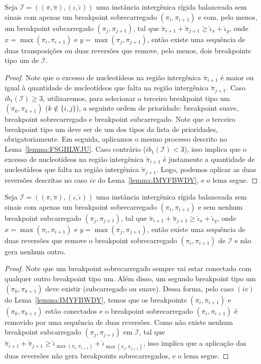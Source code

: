 \begin{lemma}\label{lemma:RHTVEKOL}
Seja $\mathcal{I} = ((\pi,\breve\pi),(\iota,\breve\iota))$ uma instância intergênica rígida balanceada sem sinais com apenas um breakpoint sobrecarregado $(\pi_i,\pi_{i+1})$ e com, pelo menos, um breakpoint subcarregado $(\pi_j,\pi_{j+1})$, tal que $\breve\pi_{i+1} + \breve\pi_{j+1} \ge \breve\iota_{x} + \breve\iota_{y}$, onde $x = \max(\pi_i,\pi_{i+1})$ e $y=\max(\pi_j,\pi_{j+1})$, então existe uma sequência de duas transposições ou duas reversões que remove, pelo menos, dois breakpoints tipo um de $\mathcal{I}$.
\end{lemma}
\begin{proof}
Note que o excesso de nucleotídeos na região intergênica $\breve\pi_{i+1}$ é maior ou igual à quantidade de nucleotídeos que falta na região intergênica $\breve\pi_{j+1}$. Caso $ib_1(\mathcal{I})\ge 3$, utilizaremos, para selecionar o terceiro breakpoint tipo um $(\pi_k,\pi_{k+1})$ ($k \notin \{i,j\}$), a seguinte ordem de prioridade: breakpoint suave, breakpoint sobrecarregado e breakpoint subcarregado. Note que o terceiro breakpoint tipo um deve ser de um dos tipos da lista de prioridades, obrigatoriamente. Em seguida, aplicamos o mesmo processo descrito no Lema~\ref{lemma:FSGHLWJU}. Caso contrário ($ib_1(\mathcal{I}) < 3$), isso implica que o excesso de nucleotídeos na região intergênica $\breve\pi_{i+1}$ é justamente a quantidade de nucleotídeos que falta na região intergênica $\breve\pi_{j+1}$. Logo, podemos aplicar as duas reversões descritas no caso $iv$ do Lema~\ref{lemma:IMYFBWDY}, e o lema segue.
\end{proof}

\begin{lemma}\label{lemma:ICDGSTEE}
Seja $\mathcal{I} = ((\pi,\breve\pi),(\iota,\breve\iota))$ uma instância intergênica rígida balanceada sem sinais com apenas um breakpoint sobrecarregado $(\pi_i,\pi_{i+1})$ e sem nenhum breakpoint subcarregado $(\pi_j,\pi_{j+1})$, tal que $\breve\pi_{i+1} + \breve\pi_{j+1} \ge \breve\iota_{x} + \breve\iota_{y}$, onde $x = \max(\pi_i,\pi_{i+1})$ e $y=\max(\pi_j,\pi_{j+1})$, então existe uma sequência de duas reversões que remove o breakpoint sobrecarregado $(\pi_i,\pi_{i+1})$ de $\mathcal{I}$ e não gera nenhum outro.
\end{lemma}
\begin{proof}
Note que um breakpoint sobrecarregado sempre vai estar conectado com qualquer outro breakpoint tipo um. Além disso, um segundo breakpoint tipo um $(\pi_k,\pi_{k+1})$ deve existir (subcarregado ou suave). Dessa forma, pelo caso $(iv)$ do Lema~\ref{lemma:IMYFBWDY}, temos que os breakpoints $(\pi_i,\pi_{i+1})$ e $(\pi_k,\pi_{k+1})$ estão conectados e o breakpoint sobrecarregado $(\pi_i,\pi_{i+1})$ é removido por uma sequência de duas reversões. Como não existe nenhum breakpoint subcarregado $(\pi_j,\pi_{j+1})$ em $\mathcal{I}$, tal que $\breve\pi_{i+1} + \breve\pi_{j+1} \ge \breve\iota_{\max(\pi_i,\pi_{i+1})} + \breve\iota_{\max(\pi_j,\pi_{j+1})}$, isso implica que a aplicação das duas reversões não gera breakpoints sobrecarregados, e o lema segue.
\end{proof}

